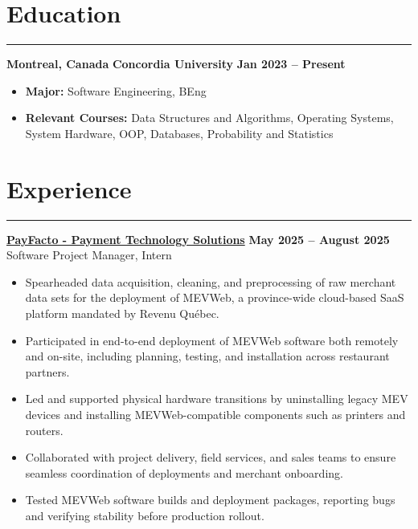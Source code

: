 \documentclass[10pt]{article}
\begin{document}
\section*{Education}
\vspace{-2mm}
\hrule
\vspace{0mm}

\textbf{Montreal, Canada} \hfill \textbf{Concordia University} \hfill \textbf{Jan 2023 -- Present} 
\vspace{-4mm}
\begin{itemize}[left=0.15in, itemsep=0pt]
    \item \textbf{Major:} Software Engineering, BEng
    \item \textbf{Relevant Courses:} Data Structures and Algorithms, Operating Systems, System Hardware, OOP, Databases, Probability and Statistics
\end{itemize}

\vspace{-6mm} %
\section*{Experience}
\vspace{-2mm}
\hrule
\vspace{0mm}

{\href{https://www.payfacto.com}{\textbf{PayFacto - Payment Technology Solutions}}} \hfill \textbf{May 2025 -- August 2025} \\
{Software Project Manager, Intern }
\vspace{-3mm}
\begin{itemize}[left=0.15in, itemsep=0pt]
    \item Spearheaded data acquisition, cleaning, and preprocessing of raw merchant data sets for the deployment of MEVWeb, a province-wide cloud-based SaaS platform mandated by Revenu Québec.
    \item Participated in end-to-end deployment of MEVWeb software both remotely and on-site, including planning, testing, and installation across restaurant partners.
    \item Led and supported physical hardware transitions by uninstalling legacy MEV devices and installing MEVWeb-compatible components such as printers and routers.
    \item Collaborated with project delivery, field services, and sales teams to ensure seamless coordination of deployments and merchant onboarding.
    \item Tested MEVWeb software builds and deployment packages, reporting bugs and verifying stability before production rollout.
\end{itemize}
\end{document}
